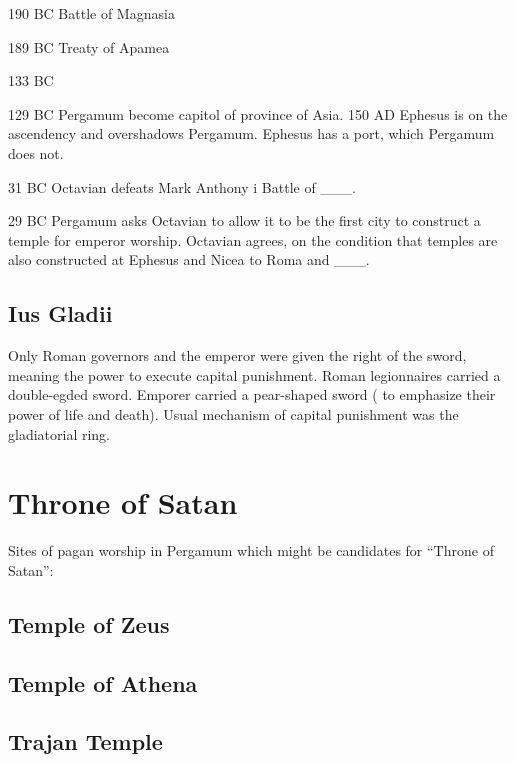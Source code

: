\documentclass[
]{book}
\begin{document}
190 BC Battle of Magnasia

189 BC Treaty of Apamea

133 BC

129 BC Pergamum become capitol of province of Asia. 150 AD Ephesus is on the ascendency and overshadows Pergamum. Ephesus has a port, which Pergamum does not.

31 BC Octavian defeats Mark Anthony i Battle of \_\_\_.

29 BC Pergamum asks Octavian to allow it to be the first city to construct a temple for emperor worship. Octavian agrees, on the condition that temples are also constructed at Ephesus and Nicea to Roma and \_\_\_.

\hypertarget{ius-gladii}{%
\subsection{Ius Gladii}\label{ius-gladii}}

Only Roman governors and the emperor were given the right of the sword, meaning the power to execute capital punishment. Roman legionnaires carried a double-egded sword. Emporer carried a pear-shaped sword ( to emphasize their power of life and death). Usual mechanism of capital punishment was the gladiatorial ring.

\hypertarget{throne-of-satan}{%
\section{Throne of Satan}\label{throne-of-satan}}

Sites of pagan worship in Pergamum which might be candidates for ``Throne of Satan'':

\hypertarget{temple-of-zeus}{%
\subsection{Temple of Zeus}\label{temple-of-zeus}}

\hypertarget{temple-of-athena}{%
\subsection{Temple of Athena}\label{temple-of-athena}}

\hypertarget{trajan-temple}{%
\subsection{Trajan Temple}\label{trajan-temple}}
\end{document}
